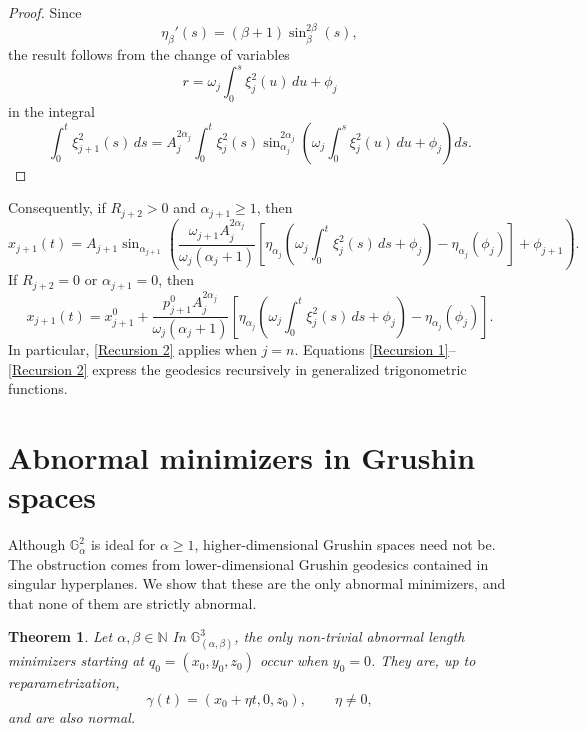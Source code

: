 \documentclass[12pt]{amsart}
\numberwithin{equation}{section}
\theoremstyle{plain}
\newtheorem{theorem}{Theorem}[section]
\theoremstyle{definition}
\theoremstyle{remark}
\begin{document}
\begin{proof}
    Since
    \[
        \eta_\beta'(s)=(\beta+1)\sin_\beta^{2\beta}(s),
    \]
    the result follows from the change of variables
    \[
        r=\omega_j\int_0^s \xi_j^2(u)\,du+\phi_j
    \]
    in the integral
    \[
        \int_0^t \xi_{j+1}^2(s)\,ds
        =
        A_j^{2\alpha_j}
        \int_0^t
        \xi_j^2(s)
        \sin_{\alpha_j}^{2\alpha_j}
        \left(
        \omega_j\int_0^s \xi_j^2(u)\,du+\phi_j
        \right)
        ds.
    \]
\end{proof}

Consequently, if \(R_{j+2}>0\) and \(\alpha_{j+1}\geq 1\), then
\begin{equation}\label{Recursion 1}
    x_{j+1}(t)
    =
    A_{j+1}
    \sin_{\alpha_{j+1}}
    \left(
    \frac{\omega_{j+1}A_j^{2\alpha_j}}{\omega_j(\alpha_j+1)}
    \left[
        \eta_{\alpha_j}
        \left(
        \omega_j\int_0^t \xi_j^2(s)\,ds+\phi_j
        \right)
        -
        \eta_{\alpha_j}(\phi_j)
        \right]
    +\phi_{j+1}
    \right).
\end{equation}
If \(R_{j+2}=0\) or \(\alpha_{j+1}=0\), then
\begin{equation}\label{Recursion 2}
    x_{j+1}(t)
    =
    x_{j+1}^0
    +
    \frac{p_{j+1}^0A_j^{2\alpha_j}}{\omega_j(\alpha_j+1)}
    \left[
        \eta_{\alpha_j}
        \left(
        \omega_j\int_0^t \xi_j^2(s)\,ds+\phi_j
        \right)
        -
        \eta_{\alpha_j}(\phi_j)
        \right].
\end{equation}
In particular, \eqref{Recursion 2} applies when \(j=n\). Equations
\eqref{Recursion 1}--\eqref{Recursion 2} express the geodesics recursively in generalized
trigonometric functions.
\section{Abnormal minimizers in Grushin spaces}

Although \(\mathbb G^2_\alpha\) is ideal for \(\alpha\geq 1\), higher-dimensional
Grushin spaces need not be. The obstruction comes from lower-dimensional Grushin
geodesics contained in singular hyperplanes. We show that these are the only abnormal
minimizers, and that none of them are strictly abnormal.

\begin{theorem}\label{3D abnormal}
    Let \(\alpha,\beta\in \mathbb{N}\) In \(\mathbb G^3_{(\alpha,\beta)}\), the only non-trivial
    abnormal length minimizers starting at \(q_0=(x_0,y_0,z_0)\) occur when \(y_0=0\).
    They are, up to reparametrization,
    \[
        \gamma(t)=(x_0+\eta t,0,z_0),
        \qquad \eta\neq 0,
    \]
    and are also normal.
\end{theorem}
\end{document}
